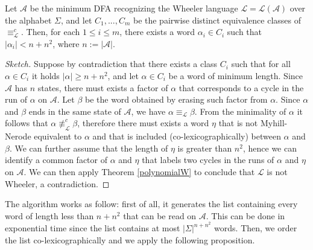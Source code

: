 \documentclass[runningheads]{llncs}
\newcommand{\la}[1]{\mathcal L(\mathcal #1)}
\begin{document}
\begin{lemma}
\label{short}
Let $\mathcal A$ be the minimum DFA recognizing the Wheeler language $\mathcal L = \la A$ over the alphabet $\Sigma$, and let $C_1,...,C_m$ be the pairwise distinct equivalence classes of $\equiv_\mathcal L^c$. Then, for each $1 \le i \le m$, there exists a word $\alpha_i \in C_i$ such that $|\alpha_i| < n + n^2$, where $n := |\mathcal A|$.
\end{lemma}
\begin{proof}[Sketch] Suppose by contradiction that there exists a class $C_i$ such that for all $\alpha \in C_i$ it holds $|\alpha| \ge n + n^2$, and let $\alpha \in C_i$ be a word of minimum length. Since $\mathcal A$ has $n$ states, there must exists a factor of $\alpha$ that corresponds to a cycle in the run of $\alpha$ on $\mathcal A$. Let $\beta$ be the word obtained by erasing such factor from $\alpha$. Since $\alpha$ and $\beta$ ends in the same state of $\mathcal A$, we have $\alpha \equiv_\mathcal L \beta$. From the minimality of $\alpha$ it follows that $\alpha \not\equiv^c_\mathcal L \beta$, therefore there must exists a word $\eta$ that is not Myhill-Nerode equivalent to $\alpha$ and that is included (co-lexicographically) between $\alpha$ and $\beta$. We can further assume that the length of $\eta$ is greater than $n^2$, hence we can identify a common factor of $\alpha$ and $\eta$ that labels two cycles in the runs of $\alpha$ and $\eta$ on $\mathcal A$. We can then apply Theorem \ref{polynomialW} to conclude that $\mathcal L$ is not Wheeler, a contradiction.
\end{proof}

The algorithm works as follow: first of all, it generates the list containing every word of length less than $n+n^2$ that can be read on $\mathcal A$. This can be done in exponential time since the list contains at most $|\Sigma|^{n+n^2}$ words. %
Then, we order the list co-lexicographically and we apply the following proposition.
\end{document}

